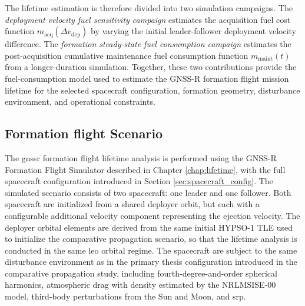 The lifetime estimation is therefore divided into two simulation campaigns. The \textit{deployment velocity fuel sensitivity campaign} estimates the acquisition fuel cost function $m_{\mathrm{acq}}(\Delta v_{\mathrm{dep}})$ by varying the initial leader-follower deployment velocity difference. The \textit{formation steady-state fuel consumption campaign} estimates the post-acquisition cumulative maintenance fuel consumption function $m_{\mathrm{maint}}(t)$ from a longer-duration simulation. Together, these two contributions provide the fuel-consumption model used to estimate the GNSS-R formation flight mission lifetime for the selected spacecraft configuration, formation geometry, disturbance environment, and operational constraints.


\subsection{Formation flight Scenario}
\label{sec:formation_flight_scenario}
The \gls{gnssr} formation flight lifetime analysis is performed using the GNSS-R Formation Flight Simulator described in Chapter \ref{chap:lifetime}, with the full spacecraft configuration introduced in Section \ref{sec:spacecraft_config}. The simulated scenario consists of two spacecraft: one leader and one follower. Both spacecraft are initialized from a shared deployer orbit, but each with a configurable additional velocity component representing the ejection velocity. The deployer orbital elements are derived from the same initial HYPSO-1 TLE used to initialize the comparative propagation scenario, so that the lifetime analysis is conducted in the same \gls{leo} orbital regime. The spacecraft are subject to the same disturbance environment as in the primary thesis configuration introduced in the comparative propagation study, including fourth-degree-and-order spherical harmonics, atmospheric drag with density estimated by the NRLMSISE-00 model, third-body perturbations from the Sun and Moon, and \gls{srp}.

